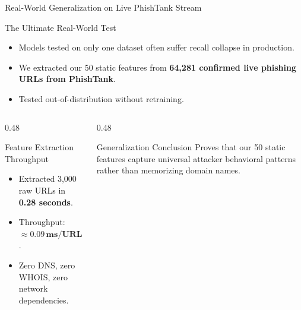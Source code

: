 \documentclass[aspectratio=169,10pt]{beamer}
\begin{document}
\begin{frame}{Real-World Generalization on Live PhishTank Stream}
    \begin{block}{The Ultimate Real-World Test}
        \begin{itemize}
            \item Models tested on only one dataset often suffer recall collapse in production.
            \item We extracted our 50 static features from \textbf{64,281 confirmed live phishing URLs from PhishTank}.
            \item Tested out-of-distribution without retraining.
        \end{itemize}
    \end{block}

    \begin{columns}[T]
        \begin{column}{0.48\textwidth}
            \begin{exampleblock}{Feature Extraction Throughput}
                \begin{itemize}
                    \item Extracted 3,000 raw URLs in \textbf{0.28 seconds}.
                    \item Throughput: $\approx \mathbf{0.09\,\text{ms/URL}}$.
                    \item Zero DNS, zero WHOIS, zero network dependencies.
                \end{itemize}
            \end{exampleblock}
        \end{column}
        \begin{column}{0.48\textwidth}
            \begin{alertblock}{Generalization Conclusion}
                Proves that our 50 static features capture universal attacker behavioral patterns rather than memorizing domain names.
            \end{alertblock}
        \end{column}
    \end{columns}
\end{frame}
\end{document}
